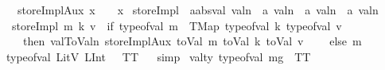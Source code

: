 \begin{isabellebody}
\ \ {\isacharbar}{\kern0pt}\ {\isachardoublequoteopen}storeImplAux\ x\ {\isacharunderscore}{\kern0pt}\ {\isacharunderscore}{\kern0pt}\ {\isacharequal}{\kern0pt}\ x{\isachardoublequoteclose}\isanewline
\isanewline
{}\isamarkupfalse%
\ storeImpl\ {\isacharcolon}{\kern0pt}{\isacharcolon}{\kern0pt}\ {\isachardoublequoteopen}{\isacharprime}{\kern0pt}a{\isacharcolon}{\kern0pt}{\isacharcolon}{\kern0pt}absval\ valn\ {\isasymRightarrow}\ {\isacharprime}{\kern0pt}a\ valn\ {\isasymRightarrow}\ {\isacharprime}{\kern0pt}a\ valn\ {\isasymRightarrow}\ {\isacharprime}{\kern0pt}a\ valn{\isachardoublequoteclose}\ \isanewline
\ \ {\isachardoublequoteopen}storeImpl\ m\ k\ v\ {\isacharequal}{\kern0pt}\ {\isacharparenleft}{\kern0pt}if\ type{\isacharunderscore}{\kern0pt}of{\isacharunderscore}{\kern0pt}val\ m\ {\isacharequal}{\kern0pt}\ TMap\ {\isacharparenleft}{\kern0pt}type{\isacharunderscore}{\kern0pt}of{\isacharunderscore}{\kern0pt}val\ k{\isacharparenright}{\kern0pt}\ {\isacharparenleft}{\kern0pt}type{\isacharunderscore}{\kern0pt}of{\isacharunderscore}{\kern0pt}val\ v{\isacharparenright}{\kern0pt}\isanewline
\ \ \ \ then\ val{}ToValn\ {\isacharparenleft}{\kern0pt}storeImplAux\ {\isacharparenleft}{\kern0pt}toVal{}{}{}{}\ m{\isacharparenright}{\kern0pt}\ {\isacharparenleft}{\kern0pt}toVal{}{}{}{}\ k{\isacharparenright}{\kern0pt}\ {\isacharparenleft}{\kern0pt}toVal{}{}{}{}\ v{\isacharparenright}{\kern0pt}{\isacharparenright}{\kern0pt}\isanewline
\ \ \ \ else\ m{\isacharparenright}{\kern0pt}{\isachardoublequoteclose}\isanewline
\isanewline
\isanewline
{}\isamarkupfalse%
\ {\isachardoublequoteopen}type{\isacharunderscore}{\kern0pt}of{\isacharunderscore}{\kern0pt}val\ {\isacharparenleft}{\kern0pt}LitV\ {\isacharparenleft}{\kern0pt}LInt\ {}{}{\isacharparenright}{\kern0pt}{\isacharparenright}{\kern0pt}\ {\isacharequal}{\kern0pt}\ TT{\isachardoublequoteclose}%
\isadelimproof
\ %
\endisadelimproof
%
\isatagproof
{}\isamarkupfalse%
\ simp%
\endisatagproof
{\isafoldproof}%
%
\isadelimproof
%
\endisadelimproof
\isanewline
{}\isamarkupfalse%
\ {\isachardoublequoteopen}val{\isacharunderscore}{\kern0pt}ty\ {\isacharparenleft}{\kern0pt}type{\isacharunderscore}{\kern0pt}of{\isacharunderscore}{\kern0pt}val\ mg{}{\isacharparenright}{\kern0pt}\ {\isacharequal}{\kern0pt}\ TT{\isachardoublequoteclose}%
\isadelimproof

\end{isabellebody}
